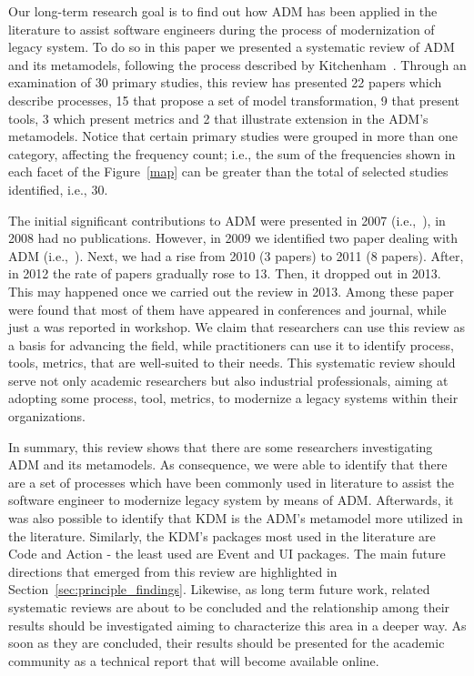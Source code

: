 Our long-term research goal is to find out how ADM has been applied in the literature to assist software engineers during the process of modernization of legacy system. To do so in this paper we presented a systematic review of ADM and its metamodels, following the process described by Kitchenham~\cite{Kitchenham}. Through an examination of 30 primary studies, this review has presented 22 papers which describe processes, 15 that propose a set of model transformation, 9 that present tools, 3 which present metrics and 2 that illustrate extension in the ADM's metamodels. Notice that certain primary studies were grouped in more than one category, affecting the frequency count; i.e., the sum of the frequencies shown in each facet of the Figure~\ref{map} can be greater than the total of selected studies identified, i.e., 30. %

The initial significant contributions to ADM were presented in 2007 (i.e.,~\cite{Mazon:2007:MDM:1784489.1784497, Guzman:2007:AAR:1339262.1339532, 4400179}), in 2008 had no publications. However, in 2009 we identified two paper dealing with ADM (i.e.,~\cite{delCastillo:2009:PRP:1529282.1529753, 5328801}). Next, we had a rise from 2010 (3 papers) to 2011 (8 papers). After, in 2012  
the rate of papers gradually rose to 13. Then, it dropped out in 2013. This may happened once we carried out the review in 2013. Among these paper were found that most of them have appeared in conferences and journal, while just a was reported in workshop. We claim that researchers can use this review as a basis for advancing the field, while practitioners can use it to identify process, tools, metrics, that are well-suited to their needs. This systematic review should serve not only academic researchers but also industrial professionals, aiming at adopting some process, tool, metrics, to modernize a legacy systems within their organizations.

In summary, this review shows that there are some researchers investigating ADM and its metamodels. As consequence, we were able to identify that there are a set of processes which have been commonly used in literature to assist the software engineer to modernize legacy system by means of ADM. Afterwards, it was also possible to identify that KDM is the ADM's metamodel more utilized in the literature. Similarly, the KDM's packages most used in the literature are Code and Action - the least used are Event and UI packages. The main future directions that emerged from this review are highlighted in Section~\ref{sec:principle_findings}. Likewise, as long term future work, related systematic reviews are about to be concluded and the relationship among their results should be investigated aiming to characterize this area in a deeper way. As soon as they are concluded, their results should be presented for the academic community as a technical report that will become available online.




